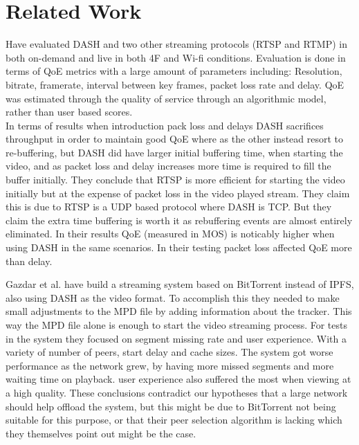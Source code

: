 \chapter{Related Work}
\label{cha:related-work}
\cite{aloman2015performance} Have evaluated DASH and two other streaming protocols (RTSP and RTMP) in both on-demand and live in both 4F and Wi-fi conditions. Evaluation is done in terms of QoE metrics with a large amount of parameters including: Resolution, bitrate, framerate, interval between key frames, packet loss rate and delay. QoE was estimated through the quality of service through an algorithmic model, rather than user based scores.\\
In terms of results when introduction pack loss and delays DASH sacrifices throughput in order to maintain good QoE where as the other instead resort to re-buffering, but DASH did have larger initial buffering time, when starting the video, and as packet loss and delay increases more time is required to fill the buffer initially. They conclude that RTSP is more efficient for starting the video initially but at the expense of packet loss in the video played stream. They claim this is due to RTSP is a UDP based protocol where DASH is TCP. But they claim the extra time buffering is worth it as rebuffering events are almost entirely eliminated. In their results QoE (measured in MOS) is noticably higher when using DASH in the same scenarios. In their testing packet loss affected QoE more than delay.




Gazdar et al. \cite{gazdar2017toward} have build a streaming system based on BitTorrent instead of \acs{IPFS}, also using \acs{DASH} as the video format. To accomplish this they needed to make small adjustments to the \acs{MPD} file by adding information about the tracker. This way the \acs{MPD} file alone is enough to start the video streaming process. For tests in the system they focused on segment missing rate and user experience. With a variety of number of peers, start delay and cache sizes. The system got worse performance as the network grew, by having more missed segments and more waiting time on playback. user experience also suffered the most when viewing at a high quality. These conclusions contradict our hypotheses that a large network should help offload the system, but this might be due to BitTorrent not being suitable for this purpose, or that their peer selection algorithm is lacking which they themselves point out might be the case.



